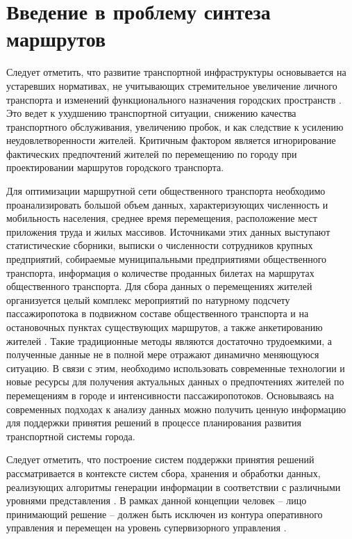 \chapter{Введение в проблему синтеза маршрутов}
Следует отметить, что развитие транспортной инфраструктуры основывается на устаревших нормативах, 
не учитывающих стремительное увеличение личного транспорта и изменений функционального назначения городских 
пространств \cite{bib:1}. Это ведет к ухудшению транспортной ситуации, снижению качества транспортного 
обслуживания, увеличению пробок, и как следствие к усилению неудовлетворенности жителей. Критичным фактором 
является игнорирование фактических предпочтений жителей по перемещению по городу при проектировании маршрутов 
городского транспорта.

Для оптимизации маршрутной сети общественного транспорта необходимо проанализировать большой объем данных, 
характеризующих численность и мобильность населения, среднее время перемещения, расположение мест приложения 
труда и жилых массивов. Источниками этих данных выступают статистические сборники, выписки о численности 
сотрудников крупных предприятий, собираемые муниципальными предприятиями общественного транспорта, 
информация о количестве проданных билетах на маршрутах общественного транспорта. Для сбора данных о 
перемещениях жителей организуется целый комплекс мероприятий по натурному подсчету пассажиропотока в 
подвижном составе общественного транспорта и на остановочных пунктах существующих маршрутов, а также 
анкетированию жителей \cite{bib:2,bib:3}. Такие традиционные методы являются достаточно трудоемкими, а 
полученные данные не в полной мере отражают динамично меняющуюся ситуацию. В связи с этим, необходимо 
использовать современные технологии и новые ресурсы для получения актуальных данных о предпочтениях жителей 
по перемещениям в городе и интенсивности пассажиропотоков. Основываясь на современных подходах к анализу 
данных можно получить ценную информацию для поддержки принятия решений в процессе планирования развития 
транспортной системы города.

Следует отметить, что построение систем поддержки принятия решений рассматривается в контексте систем 
сбора, хранения и обработки данных, реализующих алгоритмы генерации информации в соответствии с различными 
уровнями представления \cite{bib:4}. В рамках данной концепции человек -- лицо принимающий решение -- 
должен быть исключен из контура оперативного управления и перемещен на уровень супервизорного управления 
\cite{bib:5}.

